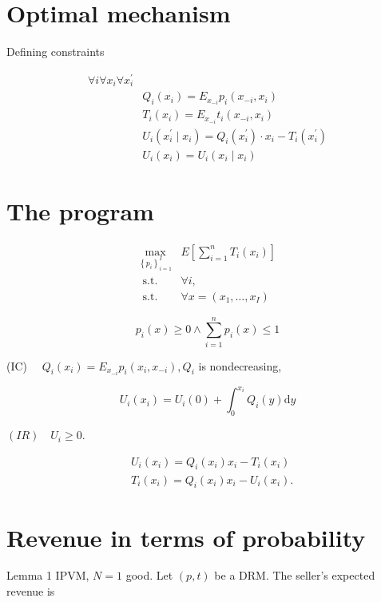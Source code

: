 \documentclass[10pt]{article}
\begin{document}
\section*{Optimal mechanism}
Defining constraints

$$
\begin{array}{ll}
\forall i \forall x_{i} \forall x_{i}^{\prime} & \\
& Q_{i}\left(x_{i}\right)=E_{x_{-i}} p_{i}\left(x_{-i}, x_{i}\right) \\
& T_{i}\left(x_{i}\right)=E_{x_{-i}} t_{i}\left(x_{-i}, x_{i}\right) \\
& U_{i}\left(x_{i}^{\prime} \mid x_{i}\right)=Q_{i}\left(x_{i}^{\prime}\right) \cdot x_{i}-T_{i}\left(x_{i}^{\prime}\right) \\
& U_{i}\left(x_{i}\right)=U_{i}\left(x_{i} \mid x_{i}\right)
\end{array}
$$

\section*{The program}
$$
\begin{array}{cl}
\max _{\left\{p_{i}\right\}_{i=1}^{I}} & E\left[\sum_{i=1}^{n} T_{i}\left(x_{i}\right)\right] \\
\text { s.t. } & \forall i, \\
\text { s.t. } & \forall x=\left(x_{1}, \ldots, x_{I}\right)
\end{array}
$$


\begin{equation*}
p_{i}(x) \geq 0 \wedge \sum_{i=1}^{n} p_{i}(x) \leq 1 \tag{1G}
\end{equation*}


(IC) $\quad Q_{i}\left(x_{i}\right)=E_{x_{-i}} p_{i}\left(x_{i}, x_{-i}\right), Q_{i}$ is nondecreasing,

$$
U_{i}\left(x_{i}\right)=U_{i}(0)+\int_{0}^{x_{i}} Q_{i}(y) \mathrm{d} y
$$

$(I R) \quad U_{i} \geq 0$.

$$
\begin{aligned}
& U_{i}\left(x_{i}\right)=Q_{i}\left(x_{i}\right) x_{i}-T_{i}\left(x_{i}\right) \\
& T_{i}\left(x_{i}\right)=Q_{i}\left(x_{i}\right) x_{i}-U_{i}\left(x_{i}\right) .
\end{aligned}
$$

\section*{Revenue in terms of probability}
Lemma 1 IPVM, $N=1$ good. Let $(p, t)$ be a DRM. The seller's expected revenue is
\end{document}
